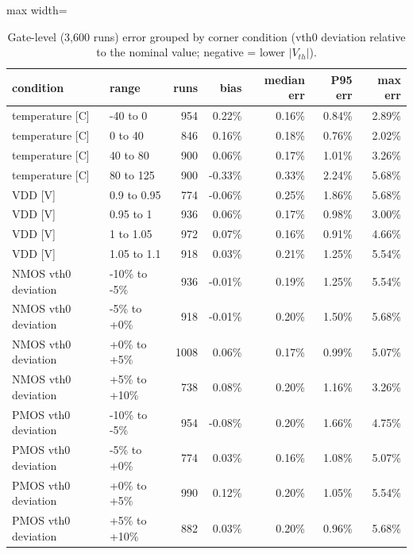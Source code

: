 \begin{table}[H]
\centering
{\small
\begin{adjustbox}{max width=\linewidth}
\begin{tabular}{llrrrrr}
\toprule
condition & range & runs & bias & median err & P95 err & max err \\
\midrule
temperature [C] & -40 to 0 & 954 & 0.22\% & 0.16\% & 0.84\% & 2.89\% \\
temperature [C] & 0 to 40 & 846 & 0.16\% & 0.18\% & 0.76\% & 2.02\% \\
temperature [C] & 40 to 80 & 900 & 0.06\% & 0.17\% & 1.01\% & 3.26\% \\
temperature [C] & 80 to 125 & 900 & -0.33\% & 0.33\% & 2.24\% & 5.68\% \\
VDD [V] & 0.9 to 0.95 & 774 & -0.06\% & 0.25\% & 1.86\% & 5.68\% \\
VDD [V] & 0.95 to 1 & 936 & 0.06\% & 0.17\% & 0.98\% & 3.00\% \\
VDD [V] & 1 to 1.05 & 972 & 0.07\% & 0.16\% & 0.91\% & 4.66\% \\
VDD [V] & 1.05 to 1.1 & 918 & 0.03\% & 0.21\% & 1.25\% & 5.54\% \\
NMOS vth0 deviation & -10\% to -5\% & 936 & -0.01\% & 0.19\% & 1.25\% & 5.54\% \\
NMOS vth0 deviation & -5\% to +0\% & 918 & -0.01\% & 0.20\% & 1.50\% & 5.68\% \\
NMOS vth0 deviation & +0\% to +5\% & 1008 & 0.06\% & 0.17\% & 0.99\% & 5.07\% \\
NMOS vth0 deviation & +5\% to +10\% & 738 & 0.08\% & 0.20\% & 1.16\% & 3.26\% \\
PMOS vth0 deviation & -10\% to -5\% & 954 & -0.08\% & 0.20\% & 1.66\% & 4.75\% \\
PMOS vth0 deviation & -5\% to +0\% & 774 & 0.03\% & 0.16\% & 1.08\% & 5.07\% \\
PMOS vth0 deviation & +0\% to +5\% & 990 & 0.12\% & 0.20\% & 1.05\% & 5.54\% \\
PMOS vth0 deviation & +5\% to +10\% & 882 & 0.03\% & 0.20\% & 0.96\% & 5.68\% \\
\bottomrule
\end{tabular}
\end{adjustbox}
}
\caption{Gate-level (3{,}600 runs) error grouped by corner condition (vth0 deviation relative to the nominal value; negative = lower $|V_{th}|$).}
\label{tab:gatecond}
\end{table}

